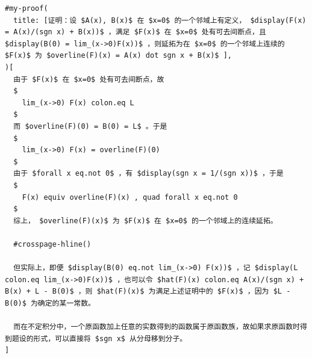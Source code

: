 \begin{verbatim}
#my-proof(
  title: [证明：设 $A(x), B(x)$ 在 $x=0$ 的一个邻域上有定义， $display(F(x) = A(x)/(sgn x) + B(x))$ ，满足 $F(x)$ 在 $x=0$ 处有可去间断点，且 $display(B(0) = lim_(x->0)F(x))$ ，则延拓为在 $x=0$ 的一个邻域上连续的 $F(x)$ 为 $overline(F)(x) = A(x) dot sgn x + B(x)$ ],
)[
  由于 $F(x)$ 在 $x=0$ 处有可去间断点，故
  $
    lim_(x->0) F(x) colon.eq L
  $
  而 $overline(F)(0) = B(0) = L$ 。于是
  $
    lim_(x->0) F(x) = overline(F)(0)
  $
  由于 $forall x eq.not 0$ ，有 $display(sgn x = 1/(sgn x))$ ，于是
  $
    F(x) equiv overline(F)(x) , quad forall x eq.not 0
  $
  综上， $overline(F)(x)$ 为 $F(x)$ 在 $x=0$ 的一个邻域上的连续延拓。

  #crosspage-hline()

  但实际上，即便 $display(B(0) eq.not lim_(x->0) F(x))$ ，记 $display(L colon.eq lim_(x->0)F(x))$ ，也可以令 $hat(F)(x) colon.eq A(x)/(sgn x) + B(x) + L - B(0)$ ，则 $hat(F)(x)$ 为满足上述证明中的 $F(x)$ ，因为 $L - B(0)$ 为确定的某一常数。

  而在不定积分中，一个原函数加上任意的实数得到的函数属于原函数族，故如果求原函数时得到题设的形式，可以直接将 $sgn x$ 从分母移到分子。
]


\end{verbatim}